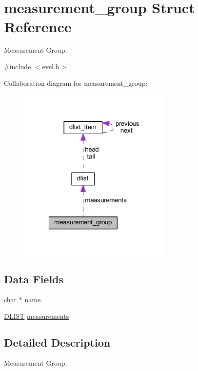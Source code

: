 \hypertarget{structmeasurement__group}{}\section{measurement\+\_\+group Struct Reference}
\label{structmeasurement__group}


Measurement Group.  




{\ttfamily \#include $<$evel.\+h$>$}



Collaboration diagram for measurement\+\_\+group\+:
\nopagebreak
\begin{figure}[H]
\begin{center}
\leavevmode
\includegraphics[width=219pt]{structmeasurement__group__coll__graph}
\end{center}
\end{figure}
\subsection*{Data Fields}
\begin{DoxyCompactItemize}
\item 
char $\ast$ \hyperlink{structmeasurement__group_a6ee37d1bc7453dad72b3da1a77c664bd}{name}
\item 
\hyperlink{double__list_8h_a45f4a129042d9e1aa4ffd31fe13e4d14}{D\+L\+I\+ST} \hyperlink{structmeasurement__group_a069f918991b814c3460b041253ad1cfa}{measurements}
\end{DoxyCompactItemize}


\subsection{Detailed Description}
Measurement Group. 

